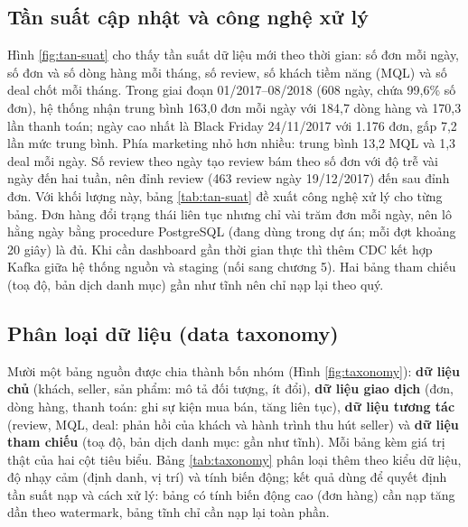 \subsection{Tần suất cập nhật và công nghệ xử lý}\label{sec:tan-suat}
Hình \ref{fig:tan-suat} cho thấy tần suất dữ liệu mới theo thời gian: số đơn mỗi ngày, số đơn và số dòng hàng mỗi tháng, số review, số khách tiềm năng (MQL) và số deal chốt mỗi tháng. Trong giai đoạn 01/2017--08/2018 (608 ngày, chứa 99,6\% số đơn), hệ thống nhận trung bình 163,0 đơn mỗi ngày với 184,7 dòng hàng và 170,3 lần thanh toán; ngày cao nhất là Black Friday 24/11/2017 với 1.176 đơn, gấp 7,2 lần mức trung bình. Phía marketing nhỏ hơn nhiều: trung bình 13,2 MQL và 1,3 deal mỗi ngày. Số review theo ngày tạo review bám theo số đơn với độ trễ vài ngày đến hai tuần, nên đỉnh review (463 review ngày 19/12/2017) đến sau đỉnh đơn.
Với khối lượng này, bảng \ref{tab:tan-suat} đề xuất công nghệ xử lý cho từng bảng. Đơn hàng đổi trạng thái liên tục nhưng chỉ vài trăm đơn mỗi ngày, nên lô hằng ngày bằng procedure PostgreSQL (đang dùng trong dự án; mỗi đợt khoảng 20 giây) là đủ. Khi cần dashboard gần thời gian thực thì thêm CDC kết hợp Kafka giữa hệ thống nguồn và staging (nối sang chương 5). Hai bảng tham chiếu (toạ độ, bản dịch danh mục) gần như tĩnh nên chỉ nạp lại theo quý.


\subsection{Phân loại dữ liệu (data taxonomy)}\label{sec:taxonomy}
Mười một bảng nguồn được chia thành bốn nhóm (Hình \ref{fig:taxonomy}): \textbf{dữ liệu chủ} (khách, seller, sản phẩm: mô tả đối tượng, ít đổi), \textbf{dữ liệu giao dịch} (đơn, dòng hàng, thanh toán: ghi sự kiện mua bán, tăng liên tục), \textbf{dữ liệu tương tác} (review, MQL, deal: phản hồi của khách và hành trình thu hút seller) và \textbf{dữ liệu tham chiếu} (toạ độ, bản dịch danh mục: gần như tĩnh). Mỗi bảng kèm giá trị thật của hai cột tiêu biểu. Bảng \ref{tab:taxonomy} phân loại thêm theo kiểu dữ liệu, độ nhạy cảm (định danh, vị trí) và tính biến động; kết quả dùng để quyết định tần suất nạp và cách xử lý: bảng có tính biến động cao (đơn hàng) cần nạp tăng dần theo watermark, bảng tĩnh chỉ cần nạp lại toàn phần.


